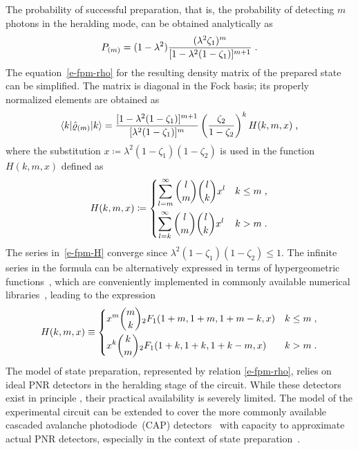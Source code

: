 \documentclass{article}
\begin{document}
The probability of successful preparation, that is, the probability of detecting $m$ photons in the heralding mode, can be obtained analytically as
%
\begin{equation}\label{e-fpm-pro}
  P_{(m)} = (1 - \lambda^{2}) 
  \frac
    { (\lambda^{2} \zeta_{1})^{m} }
    { [ 1 - \lambda^{2} (1 - \zeta_{1}) ]^{m + 1} } \;\text{.}
\end{equation}
%
The equation~\eqref{e-fpm-rho} for the resulting density matrix of the prepared state can be simplified. The matrix is diagonal in the Fock basis; its properly normalized elements are obtained as
%
\begin{equation}\label{e-fpm-rho-el}
  \braket{ k | \hat{\varrho}_{(m)} | k } =
  \frac
    { [ 1 - \lambda^{2} (1 - \zeta_{1}) ]^{m + 1} }
    { [ \lambda^{2} (1 - \zeta_{1}) ]^{m} }
  \left( \frac{ \zeta_{2} }{ 1 - \zeta_{2} } \right)^{k}
  H (k, m, x) \;\text{,}
\end{equation}
%
where the substitution ${x \coloneqq \lambda^{2} ( 1 - \zeta_{1} )(1 - \zeta_{2} )}$ is used in the function $H(k, m, x)$ defined as
%
\begin{equation}\label{e-fpm-H}
  H(k, m, x) \coloneq
  \begin{dcases}
    \sum_{l = m}^{\infty}
      \binom{l}{m}
      \binom{l}{k}
      x^{l} 
    & k \leq m \;\text{,} \\
    \sum_{l = k}^{\infty}
      \binom{l}{m}
      \binom{l}{k}
      x^{l}
    & k > m \;\text{.}
  \end{dcases}
\end{equation}
%
The series in~\eqref{e-fpm-H} converge since ${\lambda^{2} ( 1 - \zeta_{1} )(1 - \zeta_{2} ) \leq 1}$. The infinite series in the formula can be alternatively expressed in terms of hypergeometric functions~\cite{bateman1981}, which are conveniently implemented in commonly available numerical libraries~\cite{virtanen2020}, leading to the expression
%
\begin{equation}
  H(k, m, x) \equiv
  \begin{dcases}
    x^{m} \binom{m}{k} {}_{2}F_{1} (1 + m, 1 + m, 1 + m - k, x)
    & k \leq m \;\text{,} \\
    x^{k} \binom{k}{m} {}_{2}F_{1} (1 + k, 1 + k, 1 + k - m, x)
    & k > m \;\text{.}
  \end{dcases}
\end{equation}
%
The model of state preparation, represented by relation \eqref{e-fpm-rho}, relies on ideal PNR detectors in the heralding stage of the circuit. While these detectors exist in principle \cite{hopker2019,endo2021,endo2024}, their practical availability is severely limited. The model of the experimental circuit can be extended to cover the more commonly available cascaded avalanche photodiode~(CAP) detectors~\cite{hlousek2019,grygar2022,hlousek2024,ercolano2024} with capacity to approximate actual PNR detectors, especially in the context of state preparation~\cite{provaznik2020}.
\end{document}
